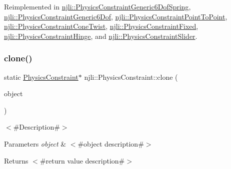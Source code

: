 Reimplemented in \mbox{\hyperlink{classnjli_1_1_physics_constraint_generic6_dof_spring_a2d22369c72fba1c3a477251c14273a2e}{njli\+::\+Physics\+Constraint\+Generic6\+Dof\+Spring}}, \mbox{\hyperlink{classnjli_1_1_physics_constraint_generic6_dof_a386006d689e37b554d43d86d718966d8}{njli\+::\+Physics\+Constraint\+Generic6\+Dof}}, \mbox{\hyperlink{classnjli_1_1_physics_constraint_point_to_point_af0766c0d2de84aa206cd4fcc33b6b9ea}{njli\+::\+Physics\+Constraint\+Point\+To\+Point}}, \mbox{\hyperlink{classnjli_1_1_physics_constraint_cone_twist_a0d6e6a5ffced973aca49898094745d75}{njli\+::\+Physics\+Constraint\+Cone\+Twist}}, \mbox{\hyperlink{classnjli_1_1_physics_constraint_fixed_a6be6f7a7df09a3602a0f4606729420d6}{njli\+::\+Physics\+Constraint\+Fixed}}, \mbox{\hyperlink{classnjli_1_1_physics_constraint_hinge_abdace027e8450d8962cbde115496b097}{njli\+::\+Physics\+Constraint\+Hinge}}, and \mbox{\hyperlink{classnjli_1_1_physics_constraint_slider_ab6ed2eeb48050c378f525ee7f80a4bd4}{njli\+::\+Physics\+Constraint\+Slider}}.

\mbox{\label{classnjli_1_1_physics_constraint_abffd36e886d036ee96c69857cfad4f9e}} 
\subsubsection{\texorpdfstring{clone()}{clone()}}
{\footnotesize\ttfamily static \mbox{\hyperlink{classnjli_1_1_physics_constraint}{Physics\+Constraint}}$\ast$ njli\+::\+Physics\+Constraint\+::clone (\begin{DoxyParamCaption}\item[{const \mbox{\hyperlink{classnjli_1_1_physics_constraint}{Physics\+Constraint}} \&}]{object }\end{DoxyParamCaption})\hspace{0.3cm}{\ttfamily [static]}}

$<$\#\+Description\#$>$


\begin{DoxyParams}{Parameters}
{\em object} & $<$\#object description\#$>$\\
\hline
\end{DoxyParams}
\begin{DoxyReturn}{Returns}
$<$\#return value description\#$>$ 
\end{DoxyReturn}
\mbox{\label{classnjli_1_1_physics_constraint_a5c8b99c2a957918ee982a6101a4a6a8a}} 

